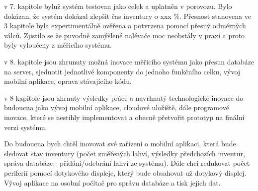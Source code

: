 v 7. kapitole byluž systém testovan jako celek a uplatněn v porovozu. Bylo dokázan, že systém dokázal zlepšit čas inventury o xxx \%. Přesnost stanovena ve 3 kapitole byla expertimentálně ověřena a potvrzena pomocí přesný odměrných válců. Zjistilo se že puvodně zamýšlené nalévače moc neobstály v praxi a proto byly vyloučeny z měřicího systému.

v 8. kapitole jsou zhrunuty možná inovace měřicího systému jako přesun databáze na server, sjednotit jednotlivé komponenty do jednoho funkčního celku, vývoj mobilní aplikace, oprava stávajícího kódu,

v 8 kapitole jsou zhrnuty výsledky práce a navrhnutý technologické inovace do budoucna jako vývoj mobilní aplikace, cloudové uložiště, dále programové inovace, které se nestihly implementovat a obecně přetvořit prototyp na finální verzi systému. 

Do budoucna bych chtěl inovovat své zařízení o mobilní aplikaci, která bude sledovat stav inventury (počet změřených lahví, výsledky předchozích inventur, správa databáze - přidání/odebrání lahví ze systému). Dále chci redukovat počet periferií pomocí dotykového displeje, který bude obsahovat už dotykový displej. Vývoj aplikace na osobní počítač pro správu databáze a tisk jejich dat. %








